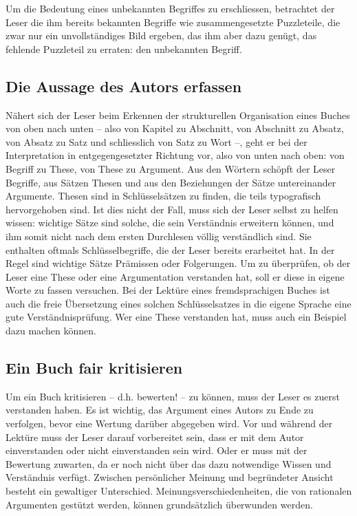 \documentclass[a4paper,11pt]{scrartcl}
\begin{document}
Um die Bedeutung eines unbekannten Begriffes zu erschliessen, betrachtet der Leser die ihm bereits bekannten Begriffe wie zusammengesetzte Puzzleteile, die zwar nur ein unvollständiges Bild ergeben, das ihm aber dazu genügt, das fehlende Puzzleteil zu erraten: den unbekannten Begriff.

\subsection{Die Aussage des Autors erfassen}

Nähert sich der Leser beim Erkennen der strukturellen Organisation eines Buches von oben nach unten – also von Kapitel zu Abschnitt, von Abschnitt zu Absatz, von Absatz zu Satz und schliesslich von Satz zu Wort –, geht er bei der Interpretation in entgegengesetzter Richtung vor, also von unten nach oben: von Begriff zu These, von These zu Argument. Aus den Wörtern schöpft der Leser Begriffe, aus Sätzen Thesen und aus den Beziehungen der Sätze untereinander Argumente. Thesen sind in Schlüsselsätzen zu finden, die teils typografisch hervorgehoben sind. Ist dies nicht der Fall, muss sich der Leser selbst zu helfen wissen: wichtige Sätze sind solche, die sein Verständnis erweitern können, und ihm somit nicht nach dem ersten Durchlesen völlig verständlich sind. Sie enthalten oftmals Schlüsselbegriffe, die der Leser bereits erarbeitet hat. In der Regel sind wichtige Sätze Prämissen oder Folgerungen. Um zu überprüfen, ob der Leser eine These oder eine Argumentation verstanden hat, soll er diese in eigene Worte zu fassen versuchen. Bei der Lektüre eines fremdsprachigen Buches ist auch die freie Übersetzung eines solchen Schlüsselsatzes in die eigene Sprache eine gute Verständnisprüfung. Wer eine These verstanden hat, muss auch ein Beispiel dazu machen können.

\subsection{Ein Buch fair kritisieren}

Um ein Buch kritisieren – d.h. bewerten! – zu können, muss der Leser es zuerst verstanden haben. Es ist wichtig, das Argument eines Autors zu Ende zu verfolgen, bevor eine Wertung darüber abgegeben wird. Vor und während der Lektüre muss der Leser darauf vorbereitet sein, dass er mit dem Autor einverstanden oder nicht einverstanden sein wird. Oder er muss mit der Bewertung zuwarten, da er noch nicht über das dazu notwendige Wissen und Verständnis verfügt. Zwischen persönlicher Meinung und begründeter Ansicht besteht ein gewaltiger Unterschied. Meinungsverschiedenheiten, die von rationalen Argumenten gestützt werden, können grundsätzlich überwunden werden.
\end{document}
